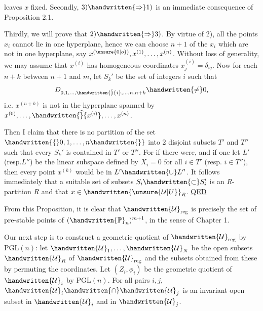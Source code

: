
leaves $x$ fixed. Secondly, $3)\handwritten{\Rightarrow}1)$ is an immediate consequence of Proposition 2.1.

Thirdly, we will prove that $2)\handwritten{\Rightarrow}3)$. By virtue of 2), all the points $x_i$ cannot lie in one hyperplane, hence we can choose $n+1$ of the $x_i$ which are not in one hyperplane, say $x^{(\unsure{0|o})},x^{(1)},\ldots,x^{(n)}$. Without loss of generality, we may assume that $x^{(i)}$ has homogeneous coordinates $x_j^{(i)}=\delta_{ij}$. Now for each $n+k$ between $n+1$ and $m$, let $S_k'$ be the set of integers $i$ such that
\[
D_{0,1,\ldots,\handwritten{\hat}{i},\ldots,n,n+k}\handwritten{\ne}0,
\]
i.e. $x^{(n+k)}$ is not in the hyperplane spanned by $x^{(0)},\ldots,\handwritten{\widehat}{x^{(i)}},\ldots,x^{(n)}$.

Then I claim that there is no partition of the set $\handwritten{\{}0,1,\ldots,n\handwritten{\}}$ into 2 disjoint subsets $T'$ and $T''$ such that every $S_k'$ is contained in $T'$ or $T''$. For if there were, and if one let $L'$ (resp.$L''$) be the linear subspace defined by $X_i=0$ for all $i\in T'$ (resp. $i\in T''$), then every point $x^{(k)}$ would be in $L'\handwritten{\cup}L''$. It follows immediately that a suitable set of subsets $S_i\handwritten{\subset}S_i'$ is an $R$-partition $R$ and that $x\in\handwritten{\unsure{\mathcal U|U}}_R$. \uline{QED}

From this Proposition, it is clear that $\handwritten{\mathcal U}_{\mathrm{reg}}$ is precisely the set of pre-stable points of $(\handwritten{\mathbb P}_n)^{m+1}$, in the sense of Chapter 1.

Our next step is to construct a geometric quotient of $\handwritten{\mathcal U}_{\mathrm{reg}}$ by $\mathrm{PGL}(n)$: let $\handwritten{\mathcal U}_1,\ldots,\handwritten{\mathcal U}_N$ be the open subsets $\handwritten{\mathcal U}_R$ of $\handwritten{\mathcal U}_{\mathrm{reg}}$ and the subsets obtained from these by permuting the coordinates. Let $(Z_i,\phi_i)$ be the geometric quotient of $\handwritten{\mathcal U}_i$ by $\mathrm{PGL}(n)$. For all pairs $i,j$, $\handwritten{\mathcal U}_i\handwritten{\cap}\handwritten{\mathcal U}_j$ is an invariant open subset in $\handwritten{\mathcal U}_i$ and in $\handwritten{\mathcal U}_j$.

